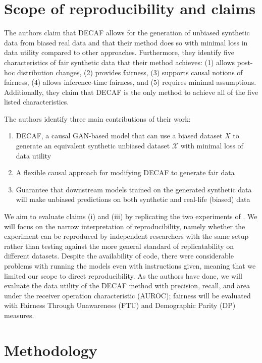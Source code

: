 \section{Scope of reproducibility and claims}

The authors claim that DECAF allows for the generation of unbiased synthetic data from biased real data and that their method does so with minimal loss in data utility compared to other approaches. Furthermore, they identify five characteristics of fair synthetic data that their method achieves: (1) allows post-hoc distribution changes, (2) provides fairness, (3) supports causal notions of fairness, (4) allows inference-time fairness, and (5) requires minimal assumptions. Additionally, they claim that DECAF is the only method to achieve all of the five listed characteristics.

The authors identify three main contributions of their work:
\begin{enumerate}[label=(\roman*)]
    \item DECAF, a causal GAN-based model that can use a biased dataset $X$ to generate an equivalent synthetic unbiased dataset $\mathcal{X}$ with minimal loss of data utility
    \item A flexible causal approach for modifying DECAF to generate fair data
    \item Guarantee that downstream models trained on the generated synthetic data will make unbiased predictions on both synthetic and real-life (biased) data
\end{enumerate}

We aim to evaluate claims (i) and (iii) by replicating the two experiments of \citep{DBLP:conf/nips/BreugelKBS21}. We will focus on the narrow interpretation of reproducibility, namely whether the experiment can be reproduced by independent researchers with the same setup rather than testing against the more general standard of replicatability on different datasets. Despite the availability of code, there were considerable problems with running the models even with instructions given, meaning that we limited our scope to direct reproducibility. As the authors have done, we will evaluate the data utility of the DECAF method with precision, recall, and area under the receiver operation characteristic (AUROC); fairness will be evaluated with Fairness Through Unawareness (FTU) and Demographic Parity (DP) measures.

\section{Methodology}

